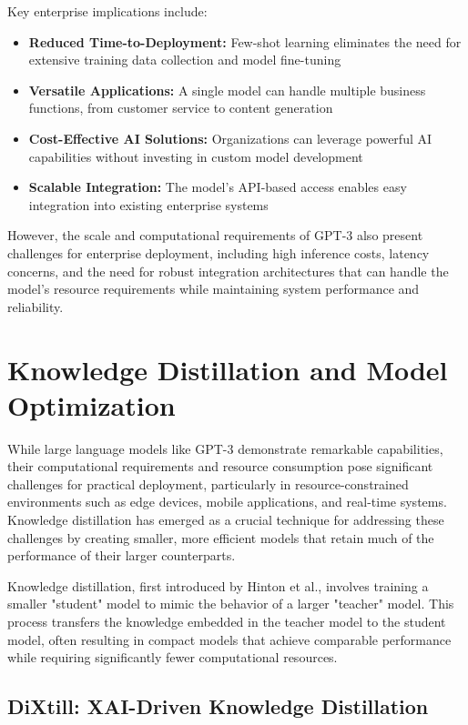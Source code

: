 Key enterprise implications include:
\begin{itemize}
    \item \textbf{Reduced Time-to-Deployment:} Few-shot learning eliminates the need for extensive training data collection and model fine-tuning
    \item \textbf{Versatile Applications:} A single model can handle multiple business functions, from customer service to content generation
    \item \textbf{Cost-Effective AI Solutions:} Organizations can leverage powerful AI capabilities without investing in custom model development
    \item \textbf{Scalable Integration:} The model's API-based access enables easy integration into existing enterprise systems
\end{itemize}

However, the scale and computational requirements of GPT-3 also present challenges for enterprise deployment, including high inference costs, latency concerns, and the need for robust integration architectures that can handle the model's resource requirements while maintaining system performance and reliability.

\section{Knowledge Distillation and Model Optimization}

While large language models like GPT-3 demonstrate remarkable capabilities, their computational requirements and resource consumption pose significant challenges for practical deployment, particularly in resource-constrained environments such as edge devices, mobile applications, and real-time systems. Knowledge distillation has emerged as a crucial technique for addressing these challenges by creating smaller, more efficient models that retain much of the performance of their larger counterparts.

Knowledge distillation, first introduced by Hinton et al., involves training a smaller "student" model to mimic the behavior of a larger "teacher" model. This process transfers the knowledge embedded in the teacher model to the student model, often resulting in compact models that achieve comparable performance while requiring significantly fewer computational resources.

\subsection{DiXtill: XAI-Driven Knowledge Distillation}

